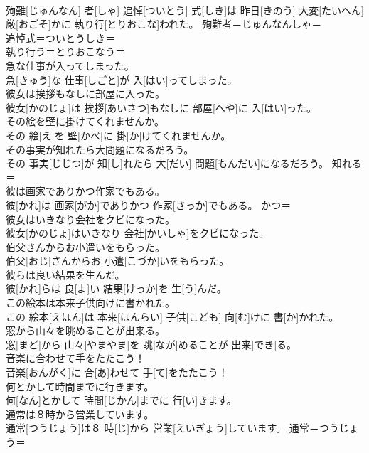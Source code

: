 \documentclass[8pt]{extreport}
\begin{document}
\begin{CJK}{UTF8}{min}
\\	殉難[じゅんなん] 者[しゃ] 追悼[ついとう] 式[しき]は 昨日[きのう] 大変[たいへん] 厳[おごそ]かに 執り行[とりおこな]われた。	殉難者＝じゅんなんしゃ＝ 
\\	追悼式＝ついとうしき＝ 
\\	執り行う＝とりおこなう＝ 
\\	急な仕事が入ってしまった。	
\\	急[きゅう]な 仕事[しごと]が 入[はい]ってしまった。	
\\	彼女は挨拶もなしに部屋に入った。	
\\	彼女[かのじょ]は 挨拶[あいさつ]もなしに 部屋[へや]に 入[はい]った。	
\\	その絵を壁に掛けてくれませんか。	
\\	その 絵[え]を 壁[かべ]に 掛[か]けてくれませんか。	
\\	その事実が知れたら大問題になるだろう。	
\\	その 事実[じじつ]が 知[し]れたら 大[だい] 問題[もんだい]になるだろう。	知れる＝ 
\\	彼は画家でありかつ作家でもある。	
\\	彼[かれ]は 画家[がか]でありかつ 作家[さっか]でもある。	かつ＝ 
\\	彼女はいきなり会社をクビになった。	
\\	彼女[かのじょ]はいきなり 会社[かいしゃ]をクビになった。	
\\	伯父さんからお小遣いをもらった。	
\\	伯父[おじ]さんからお 小遣[こづか]いをもらった。	
\\	彼らは良い結果を生んだ。	
\\	彼[かれ]らは 良[よ]い 結果[けっか]を 生[う]んだ。	
\\	この絵本は本来子供向けに書かれた。	
\\	この 絵本[えほん]は 本来[ほんらい] 子供[こども] 向[む]けに 書[か]かれた。	
\\	窓から山々を眺めることが出来る。	
\\	窓[まど]から 山々[やまやま]を 眺[なが]めることが 出来[でき]る。	
\\	音楽に合わせて手をたたこう！	
\\	音楽[おんがく]に 合[あ]わせて 手[て]をたたこう！	
\\	何とかして時間までに行きます。	
\\	何[なん]とかして 時間[じかん]までに 行[い]きます。	
\\	通常は８時から営業しています。	
\\	通常[つうじょう]は８ 時[じ]から 営業[えいぎょう]しています。	通常＝つうじょう＝ 

\end{CJK}
\end{document}
